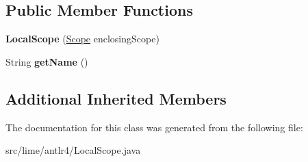 \subsection*{Public Member Functions}
\begin{DoxyCompactItemize}
\item 
\mbox{\label{classlime_1_1antlr4_1_1LocalScope_a99e6bbd9736491396241dbceed4a8a95}} 
{\bfseries Local\+Scope} (\hyperlink{interfacelime_1_1antlr4_1_1Scope}{Scope} enclosing\+Scope)
\item 
\mbox{\label{classlime_1_1antlr4_1_1LocalScope_a503a34ad95208625ddbe8fda1473aa76}} 
String {\bfseries get\+Name} ()
\end{DoxyCompactItemize}
\subsection*{Additional Inherited Members}


The documentation for this class was generated from the following file\+:\begin{DoxyCompactItemize}
\item 
src/lime/antlr4/Local\+Scope.\+java\end{DoxyCompactItemize}
